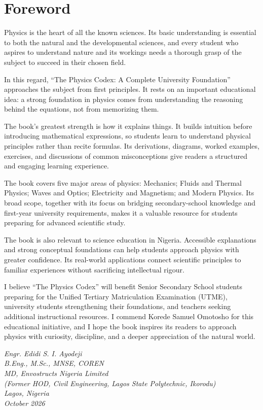 
\chapter*{Foreword}

Physics is the heart of all the known sciences. Its basic understanding is essential to both the natural and the developmental sciences, and every student who aspires to understand nature and its workings needs a thorough grasp of the subject to succeed in their chosen field.

In this regard, ``The Physics Codex: A Complete University Foundation'' approaches the subject from first principles. It rests on an important educational idea: a strong foundation in physics comes from understanding the reasoning behind the equations, not from memorizing them.

The book's greatest strength is how it explains things. It builds intuition before introducing mathematical expressions, so students learn to understand physical principles rather than recite formulas. Its derivations, diagrams, worked examples, exercises, and discussions of common misconceptions give readers a structured and engaging learning experience.

The book covers five major areas of physics: Mechanics; Fluids and Thermal Physics; Waves and Optics; Electricity and Magnetism; and Modern Physics. Its broad scope, together with its focus on bridging secondary-school knowledge and first-year university requirements, makes it a valuable resource for students preparing for advanced scientific study.

The book is also relevant to science education in Nigeria. Accessible explanations and strong conceptual foundations can help students approach physics with greater confidence. Its real-world applications connect scientific principles to familiar experiences without sacrificing intellectual rigour.

I believe ``The Physics Codex'' will benefit Senior Secondary School students preparing for the Unified Tertiary Matriculation Examination (UTME), university students strengthening their foundations, and teachers seeking additional instructional resources. I commend Korede Samuel Omotosho for this educational initiative, and I hope the book inspires its readers to approach physics with curiosity, discipline, and a deeper appreciation of the natural world.

\vspace{2cm}

\begin{flushright}
\textit{Engr. Edidi S. I. Ayodeji}\\
\textit{B.Eng., M.Sc., MNSE, COREN}\\
\textit{MD, Envostructs Nigeria Limited}\\
\textit{(Former HOD, Civil Engineering, Lagos State Polytechnic, Ikorodu)}\\
\textit{Lagos, Nigeria}\\
\textit{October 2026}
\end{flushright}
